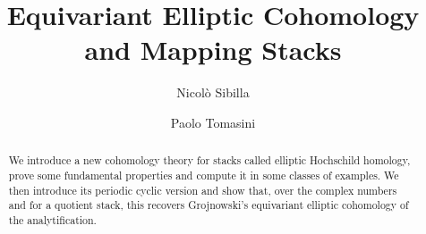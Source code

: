 \documentclass[11pt,letterpaper]{amsart}
\begin{document}
\author[Sibilla]{Nicol\`o Sibilla}
\address{Nicol\`o Sibilla, SISSA\\ 
Via Bonomea 265\\ 34136 Trieste TS\\
Italy}


\author[Tomasini]{Paolo Tomasini}
\address{Paolo Tomasini, SISSA\\
Via Bonomea 265\\ 34136 Trieste TS\\
Italy}



 

\title[Equivariant Elliptic Cohomology and Mapping Stacks]{Equivariant Elliptic Cohomology and Mapping Stacks} 




\begin{abstract}
We introduce a new cohomology theory for stacks called elliptic Hochschild homology, prove some fundamental properties and compute it in some classes of examples. We then introduce its periodic cyclic version and show that, over the complex numbers and for a quotient stack,   this recovers Grojnowski's equivariant elliptic cohomology of the analytification.
\end{abstract}

\maketitle

\tableofcontents
\setcounter{tocdepth}{3}
\end{document}
